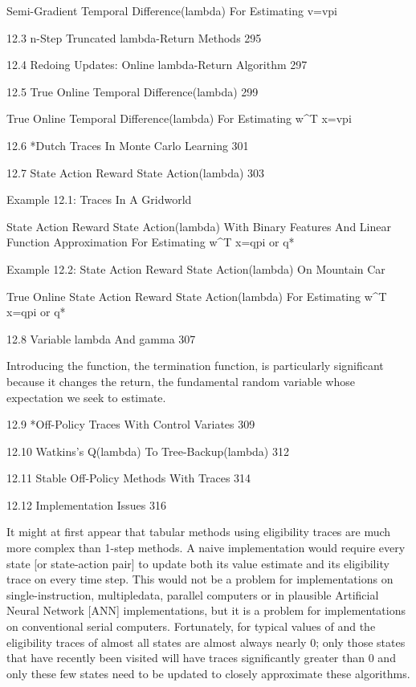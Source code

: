 Semi-Gradient Temporal Difference(lambda) For Estimating v=vpi

12.3 n-Step Truncated lambda-Return Methods 295



12.4 Redoing Updates: Online lambda-Return Algorithm 297



12.5 True Online Temporal Difference(lambda) 299

True Online Temporal Difference(lambda) For Estimating w^T x=vpi

12.6 *Dutch Traces In Monte Carlo Learning 301



12.7 State Action Reward State Action(lambda) 303

Example 12.1: Traces In A Gridworld

State Action Reward State Action(lambda) With Binary Features And Linear Function Approximation For Estimating w^T x=qpi or q*

Example 12.2: State Action Reward State Action(lambda) On Mountain Car

True Online State Action Reward State Action(lambda) For Estimating w^T x=qpi or q*

12.8 Variable lambda And gamma 307

Introducing the function, the termination function, is particularly significant because it changes the return, the fundamental random variable whose expectation we seek to estimate.

12.9 *Off-Policy Traces With Control Variates 309



12.10 Watkins's Q(lambda) To Tree-Backup(lambda) 312



12.11 Stable Off-Policy Methods With Traces 314



12.12 Implementation Issues 316

It might at first appear that tabular methods using eligibility traces are much more complex than 1-step methods. A naive implementation would require every state [or state-action pair] to update both its value estimate and its eligibility trace on every time step. This would not be a problem for implementations on single-instruction, multipledata, parallel computers or in plausible Artificial Neural Network [ANN] implementations, but it is a problem for implementations on conventional serial computers. Fortunately, for typical values of and the eligibility traces of almost all states are almost always nearly 0; only those states that have recently been visited will have traces significantly greater than 0 and only these few states need to be updated to closely approximate these algorithms.


